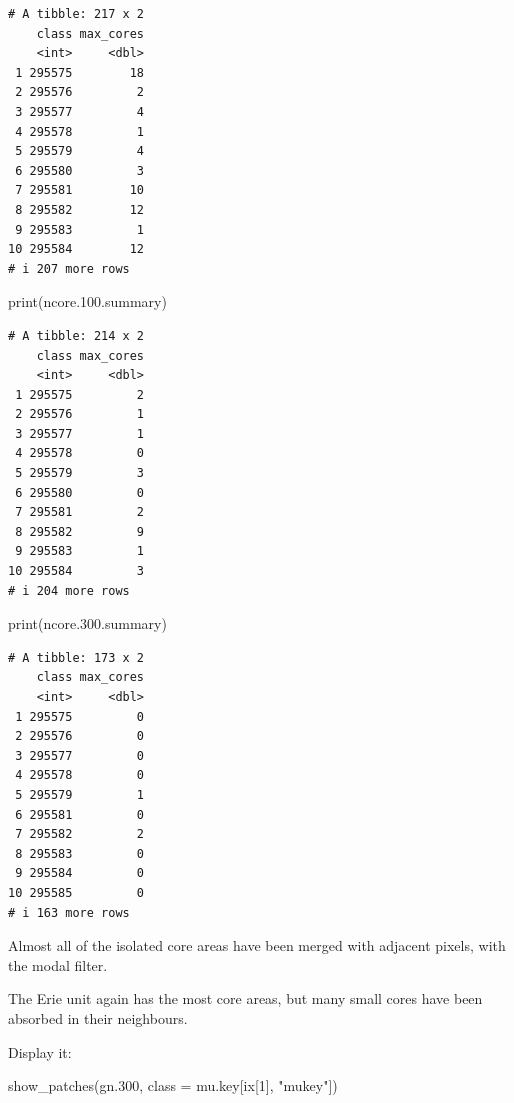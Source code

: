 \documentclass[
  letterpaper,
  DIV=11,
  numbers=noendperiod]{scrartcl}
\newenvironment{Shaded}{\begin{snugshade}}{\end{snugshade}}
\newcommand{\AttributeTok}[1]{\textcolor[rgb]{0.40,0.45,0.13}{#1}}
\newcommand{\DecValTok}[1]{\textcolor[rgb]{0.68,0.00,0.00}{#1}}
\newcommand{\FloatTok}[1]{\textcolor[rgb]{0.68,0.00,0.00}{#1}}
\newcommand{\FunctionTok}[1]{\textcolor[rgb]{0.28,0.35,0.67}{#1}}
\newcommand{\NormalTok}[1]{\textcolor[rgb]{0.00,0.23,0.31}{#1}}
\newcommand{\StringTok}[1]{\textcolor[rgb]{0.13,0.47,0.30}{#1}}
\begin{document}
\begin{verbatim}
# A tibble: 217 x 2
    class max_cores
    <int>     <dbl>
 1 295575        18
 2 295576         2
 3 295577         4
 4 295578         1
 5 295579         4
 6 295580         3
 7 295581        10
 8 295582        12
 9 295583         1
10 295584        12
# i 207 more rows
\end{verbatim}

\begin{Shaded}
\begin{Highlighting}[]
\FunctionTok{print}\NormalTok{(ncore.}\FloatTok{100.}\NormalTok{summary)}
\end{Highlighting}
\end{Shaded}

\begin{verbatim}
# A tibble: 214 x 2
    class max_cores
    <int>     <dbl>
 1 295575         2
 2 295576         1
 3 295577         1
 4 295578         0
 5 295579         3
 6 295580         0
 7 295581         2
 8 295582         9
 9 295583         1
10 295584         3
# i 204 more rows
\end{verbatim}

\begin{Shaded}
\begin{Highlighting}[]
\FunctionTok{print}\NormalTok{(ncore.}\FloatTok{300.}\NormalTok{summary)}
\end{Highlighting}
\end{Shaded}

\begin{verbatim}
# A tibble: 173 x 2
    class max_cores
    <int>     <dbl>
 1 295575         0
 2 295576         0
 3 295577         0
 4 295578         0
 5 295579         1
 6 295581         0
 7 295582         2
 8 295583         0
 9 295584         0
10 295585         0
# i 163 more rows
\end{verbatim}

Almost all of the isolated core areas have been merged with adjacent
pixels, with the modal filter.

The Erie unit again has the most core areas, but many small cores have
been absorbed in their neighbours.

Display it:

\begin{Shaded}
\begin{Highlighting}[]
\FunctionTok{show\_patches}\NormalTok{(gn}\FloatTok{.300}\NormalTok{, }\AttributeTok{class =}\NormalTok{ mu.key[ix[}\DecValTok{1}\NormalTok{], }\StringTok{"mukey"}\NormalTok{])}
\end{Highlighting}
\end{Shaded}
\end{document}
